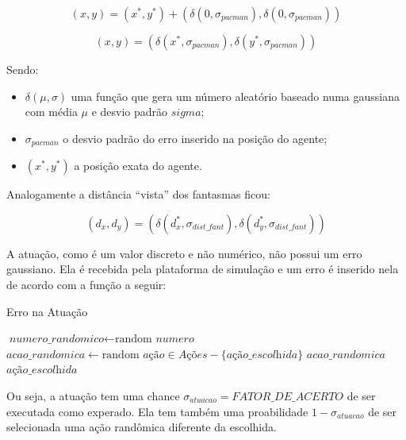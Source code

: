 $$
	\left( x, y \right) = \left( x^*, y^* \right) + \left( \delta\left( 0, \sigma_{pacman} \right), \delta\left( 0, \sigma_{pacman} \right) \right)
$$

\begin{equation}
	\left( x, y \right) = \left( \delta\left( x^*, \sigma_{pacman} \right), \delta\left( y^*, \sigma_{pacman} \right) \right)
\end{equation}

Sendo:

\begin{itemize}
	\item $ \delta \left( \mu, \sigma \right) $ uma função que gera um número aleatório baseado numa gaussiana com média $ \mu $ e desvio padrão $ 
sigma $;
	\item $ \sigma_{pacman} $ o desvio padrão do erro inserido na posição do agente;
	\item $ \left( x^*, y^* \right) $ a posição exata do agente.
\end{itemize}

Analogamente a distância ``vista'' dos fantasmas ficou:

\begin{equation}
	\left( d_x, d_y \right) = \left( \delta\left( d_x^*, \sigma_{dist\_fant} \right), \delta\left( d_y^*, \sigma_{dist\_fant} \right) \right)
\end{equation}

A atuação, como é um valor discreto e não numérico, não possui um erro gaussiano. Ela é recebida pela plataforma de simulação e um erro é inserido nela de acordo com a função a seguir:

\begin{algorithm}[H]
	\caption{Erro na Atuação} \label{euclid}
	\begin{algorithmic}[1]
			\State $\textit{numero\_randomico} \gets \text{random }\textit{numero}$
				\State $\textit{acao\_randomica} \gets \text{random }\textit{ação} \in \textit{Ações}-\textit{\{ação\_escolhida\}}$
				\State \Return $\textit{acao\_randomica}$
			\Else
				\State \Return $\textit{ação\_escolhida}$
			\EndIf
		\EndProcedure
	\end{algorithmic}
\end{algorithm}

Ou seja, a atuação tem uma chance $ \sigma_{atuacao} = \textit{FATOR\_DE\_ACERTO} $ de ser executada como experado. Ela tem também uma proabilidade $ 1 - \sigma_{atuacao} $ de ser selecionada uma ação randômica diferente da escolhida.
